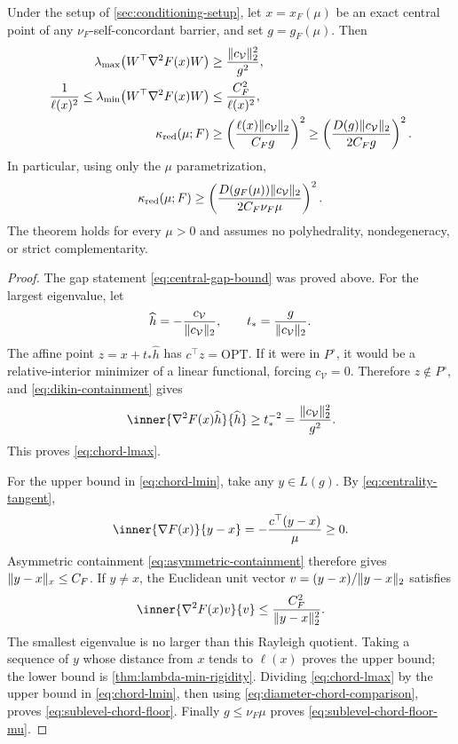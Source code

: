\begin{theorem}
\label{thm:sublevel-chord-law}
Under the setup of \cref{sec:conditioning-setup}, let
$x=x_F(\mu)$ be an exact central point of any
$\nu_F$-self-concordant barrier, and set $g=g_F(\mu)$.  Then
\begin{align}
 \lambda_{\max}\!\left(W^\top\nabla^2F(x)W\right)
 &\geq \frac{\lVert c_{\mathcal V}\rVert_2^2}{g^2},
 \label{eq:chord-lmax}\\
 \frac1{\ell(x)^2}
 \leq\lambda_{\min}\!\left(W^\top\nabla^2F(x)W\right)
 &\leq\frac{C_F^2}{\ell(x)^2},
 \label{eq:chord-lmin}\\
 \kappa_{\rm red}(\mu;F)
 &\geq
 \left(\frac{\ell(x)\lVert c_{\mathcal V}\rVert_2}{C_Fg}\right)^2
 \geq
 \left(\frac{D(g)\lVert c_{\mathcal V}\rVert_2}{2C_Fg}\right)^2.
 \label{eq:sublevel-chord-floor}
\end{align}
In particular, using only the $\mu$ parametrization,
\begin{equation}
 \kappa_{\rm red}(\mu;F)
 \geq
 \left(
  \frac{D(g_F(\mu))\lVert c_{\mathcal V}\rVert_2}
       {2C_F\nu_F\mu}
 \right)^2.
 \label{eq:sublevel-chord-floor-mu}
\end{equation}
The theorem holds for every $\mu>0$ and assumes no polyhedrality,
nondegeneracy, or strict complementarity.
\end{theorem}

\begin{proof}
The gap statement \eqref{eq:central-gap-bound} was proved above.  For the
largest eigenvalue, let
\[
 \widehat h=-\frac{c_{\mathcal V}}{\lVert c_{\mathcal V}\rVert_2},
 \qquad
 t_* =\frac{g}{\lVert c_{\mathcal V}\rVert_2}.
\]
The affine point $z=x+t_*\widehat h$ has $c^\top z=\mathrm{OPT}$.  If it
were in $P^\circ$, it would be a relative-interior minimizer of a linear
functional, forcing $c_{\mathcal V}=0$.  Therefore $z\notin P^\circ$, and
\eqref{eq:dikin-containment} gives
\[
 \inner{\nabla^2F(x)\widehat h}{\widehat h}
 \geq t_*^{-2}=\frac{\norm{c_{\mathcal V}}_2^2}{g^2}.
\]
This proves \eqref{eq:chord-lmax}.

For the upper bound in \eqref{eq:chord-lmin}, take any $y\in L(g)$.  By
\eqref{eq:centrality-tangent},
\[
 \inner{\nabla F(x)}{y-x}
 =-\frac{c^\top(y-x)}\mu\geq0.
\]
Asymmetric containment \eqref{eq:asymmetric-containment} therefore gives
$\lVert y-x\rVert_x\leq C_F$.  If $y\ne x$, the Euclidean unit vector
$v=(y-x)/\lVert y-x\rVert_2$ satisfies
\[
 \inner{\nabla^2F(x)v}{v}
 \leq\frac{C_F^2}{\norm{y-x}_2^2}.
\]
The smallest eigenvalue is no larger than this Rayleigh quotient.  Taking a
sequence of $y$ whose distance from $x$ tends to $\ell(x)$ proves the upper
bound; the lower bound is \cref{thm:lambda-min-rigidity}.  Dividing
\eqref{eq:chord-lmax} by the upper bound in \eqref{eq:chord-lmin}, then using
\eqref{eq:diameter-chord-comparison}, proves
\eqref{eq:sublevel-chord-floor}.  Finally $g\leq\nu_F\mu$ proves
\eqref{eq:sublevel-chord-floor-mu}.
\end{proof}

